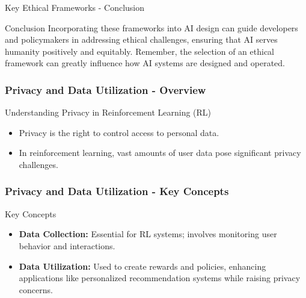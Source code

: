 \documentclass[aspectratio=169]{beamer}
\begin{document}
\begin{frame}[fragile]{Key Ethical Frameworks - Conclusion}
    \begin{block}{Conclusion}
        Incorporating these frameworks into AI design can guide developers and policymakers in addressing ethical challenges, ensuring that AI serves humanity positively and equitably. Remember, the selection of an ethical framework can greatly influence how AI systems are designed and operated.
    \end{block}
\end{frame}

\begin{frame}[fragile]
    \frametitle{Privacy and Data Utilization - Overview}
    \begin{block}{Understanding Privacy in Reinforcement Learning (RL)}
        \begin{itemize}
            \item Privacy is the right to control access to personal data.
            \item In reinforcement learning, vast amounts of user data pose significant privacy challenges.
        \end{itemize}
    \end{block}
\end{frame}

\begin{frame}[fragile]
    \frametitle{Privacy and Data Utilization - Key Concepts}
    \begin{block}{Key Concepts}
        \begin{itemize}
            \item \textbf{Data Collection:} Essential for RL systems; involves monitoring user behavior and interactions.
            \item \textbf{Data Utilization:} Used to create rewards and policies, enhancing applications like personalized recommendation systems while raising privacy concerns.
        \end{itemize}
    \end{block}
\end{frame}
\end{document}
